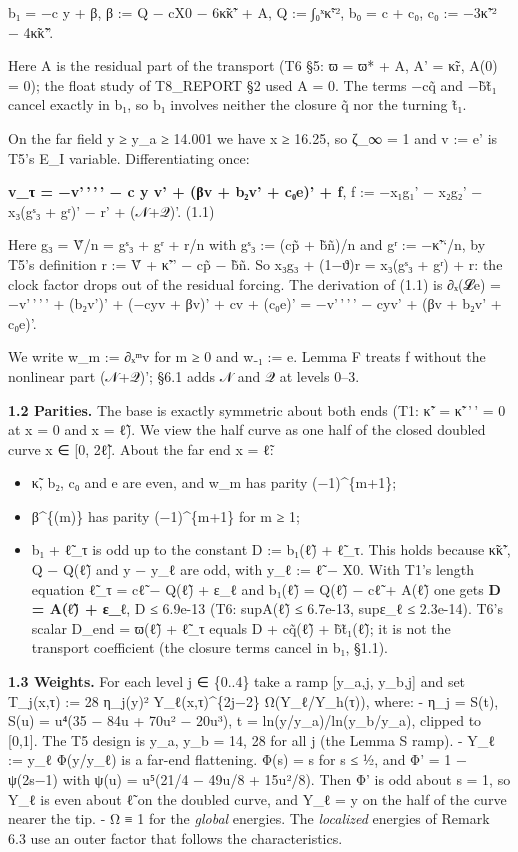 \documentclass[
]{article}
\providecommand{\tightlist}{%
  \setlength{\itemsep}{0pt}\setlength{\parskip}{0pt}}
\begin{document}
b₁ = −c y + β, β := Q − cX0 − 6κ̃κ̃' + A, Q := ∫₀ˣκ̃`², b₀ = c + c₀, c₀ :=
−3κ̃'² − 4κ̃κ̃''.

Here A is the residual part of the transport (T6 §5: ϖ = ϖ* + A, A' =
κ̃r, A(0) = 0); the float study of T8\_REPORT §2 used A = 0. The terms
−cq̃ and −b̃t̃₁ cancel exactly in b₁, so b₁ involves neither the closure q̃
nor the turning t̃₁.

On the far field y ≥ y\_a ≥ 14.001 we have x ≥ 16.25, so ζ\_∞ = 1 and v
:= e' is T5's E\_I variable. Differentiating once:

\textbf{v\_τ = −v'\,'\,'\,' − c y v' + (βv + b₂v' + c₀e)' + f}, f :=
−x₁g₁' − x₂g₂' − x₃(gˢ₃ + gʳ)' − r' + (𝒩+𝒬)'. (1.1)

Here g₃ = Ṽ/n = gˢ₃ + gʳ + r/n with gˢ₃ := (cp̃ + b̃ñ)/n and gʳ := −κ̃'`/n,
by T5's definition r := Ṽ + κ̃'' − cp̃ − b̃ñ. So x₃g₃ + (1−ϑ)r = x₃(gˢ₃ +
gʳ) + r: the clock factor drops out of the residual forcing. The
derivation of (1.1) is ∂ₓ(𝓛e) = −v'\,'\,'\,' + (b₂v')' + (−cyv + βv)' +
cv + (c₀e)' = −v'\,'\,'\,' − cyv' + (βv + b₂v' + c₀e)'.

We write w\_m := ∂ₓᵐv for m ≥ 0 and w₋₁ := e. Lemma F treats f without
the nonlinear part (𝒩+𝒬)'; §6.1 adds 𝒩 and 𝒬 at levels 0--3.

\textbf{1.2 Parities.} The base is exactly symmetric about both ends
(T1: κ̃' = κ̃'\,'\,' = 0 at x = 0 and x = ℓ̃). We view the half curve as
one half of the closed doubled curve x ∈ {[}0, 2ℓ̃{]}. About the far end
x = ℓ̃:

\begin{itemize}
\tightlist
\item
  κ̃, b₂, c₀ and e are even, and w\_m has parity (−1)\^{}\{m+1\};
\item
  β\^{}\{(m)\} has parity (−1)\^{}\{m+1\} for m ≥ 1;
\item
  b₁ + ℓ̃\_τ is odd up to the constant D := b₁(ℓ̃) + ℓ̃\_τ. This holds
  because κ̃κ̃', Q − Q(ℓ̃) and y − y\_ℓ are odd, with y\_ℓ := ℓ̃ − X0. With
  T1's length equation ℓ̃\_τ = cℓ̃ − Q(ℓ̃) + ε\_ℓ and b₁(ℓ̃) = Q(ℓ̃) − cℓ̃ +
  A(ℓ̃) one gets \textbf{D = A(ℓ̃) + ε\_ℓ}, \textbar D\textbar{} ≤ 6.9e-13
  (T6: sup\textbar A(ℓ̃)\textbar{} ≤ 6.7e-13, sup\textbar ε\_ℓ\textbar{}
  ≤ 2.3e-14). T6's scalar D\_end = ϖ(ℓ̃) + ℓ̃\_τ equals D + cq̃(ℓ̃) +
  b̃t̃₁(ℓ̃); it is not the transport coefficient (the closure terms cancel
  in b₁, §1.1).
\end{itemize}

\textbf{1.3 Weights.} For each level j ∈ \{0..4\} take a ramp {[}y\_a,j,
y\_b,j{]} and set T\_j(x,τ) := 28 η\_j(y)² Y\_ℓ(x,τ)\^{}\{2j−2\}
Ω(Y\_ℓ/Y\_h(τ)), where: - η\_j = S(t), S(u) = u⁴(35 − 84u + 70u² −
20u³), t = ln(y/y\_a)/ln(y\_b/y\_a), clipped to {[}0,1{]}. The T5 design
is y\_a, y\_b = 14, 28 for all j (the Lemma S ramp). - Y\_ℓ := y\_ℓ
Φ(y/y\_ℓ) is a far-end flattening. Φ(s) = s for s ≤ ½, and Φ' = 1 −
ψ(2s−1) with ψ(u) = u⁵(21/4 − 49u/8 + 15u²/8). Then Φ' is odd about s =
1, so Y\_ℓ is even about ℓ̃ on the doubled curve, and Y\_ℓ = y on the
half of the curve nearer the tip. - Ω ≡ 1 for the \emph{global}
energies. The \emph{localized} energies of Remark 6.3 use an outer
factor that follows the characteristics.
\end{document}

